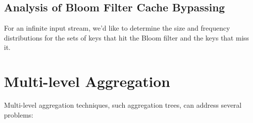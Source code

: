 \documentclass[twocolumn, 10pt]{article}
\begin{document}
\subsection{Analysis of Bloom Filter Cache Bypassing}

For an infinite input stream, we'd like to determine the size and frequency
distributions for the sets of keys that hit the Bloom filter and the keys that
miss it.



















\section{Multi-level Aggregation}

Multi-level aggregation techniques, such aggregation trees, can address
several problems:
\end{document}
